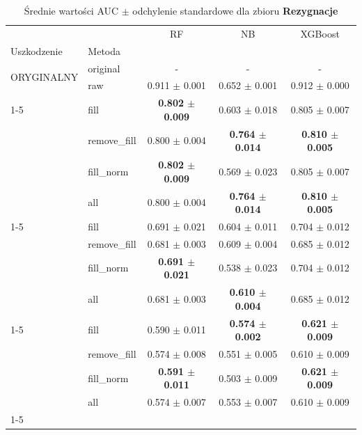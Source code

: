 \begin{table}[htbp]
\caption{Średnie wartości AUC $\pm$ odchylenie standardowe dla zbioru \textbf{Rezygnacje}}
\label{tab:wyniki_rezygnacje}
\begin{tabular}{llccc}
\toprule
 &  & RF & NB & XGBoost \\
Uszkodzenie & Metoda &  &  &  \\
\midrule
\multirow[t]{2}{*}{ORYGINALNY} & original & - & - & - \\
 & raw & 0.911 $\pm$ 0.001 & 0.652 $\pm$ 0.001 & 0.912 $\pm$ 0.000 \\
\cline{1-5}
\multirow[t]{5}{*}{20%
 & fill & \textbf{0.802 $\pm$ 0.009} & 0.603 $\pm$ 0.018 & 0.805 $\pm$ 0.007 \\
 & remove_fill & 0.800 $\pm$ 0.004 & \textbf{0.764 $\pm$ 0.014} & \textbf{0.810 $\pm$ 0.005} \\
 & fill_norm & \textbf{0.802 $\pm$ 0.009} & 0.569 $\pm$ 0.023 & 0.805 $\pm$ 0.007 \\
 & all & 0.800 $\pm$ 0.004 & \textbf{0.764 $\pm$ 0.014} & \textbf{0.810 $\pm$ 0.005} \\
\cline{1-5}
\multirow[t]{5}{*}{40%
 & fill & 0.691 $\pm$ 0.021 & 0.604 $\pm$ 0.011 & 0.704 $\pm$ 0.012 \\
 & remove_fill & 0.681 $\pm$ 0.003 & 0.609 $\pm$ 0.004 & 0.685 $\pm$ 0.012 \\
 & fill_norm & \textbf{0.691 $\pm$ 0.021} & 0.538 $\pm$ 0.023 & 0.704 $\pm$ 0.012 \\
 & all & 0.681 $\pm$ 0.003 & \textbf{0.610 $\pm$ 0.004} & 0.685 $\pm$ 0.012 \\
\cline{1-5}
\multirow[t]{5}{*}{60%
 & fill & 0.590 $\pm$ 0.011 & \textbf{0.574 $\pm$ 0.002} & \textbf{0.621 $\pm$ 0.009} \\
 & remove_fill & 0.574 $\pm$ 0.008 & 0.551 $\pm$ 0.005 & 0.610 $\pm$ 0.009 \\
 & fill_norm & \textbf{0.591 $\pm$ 0.011} & 0.503 $\pm$ 0.009 & \textbf{0.621 $\pm$ 0.009} \\
 & all & 0.574 $\pm$ 0.007 & 0.553 $\pm$ 0.007 & 0.610 $\pm$ 0.009 \\
\cline{1-5}
\bottomrule
\end{tabular}
\end{table}
